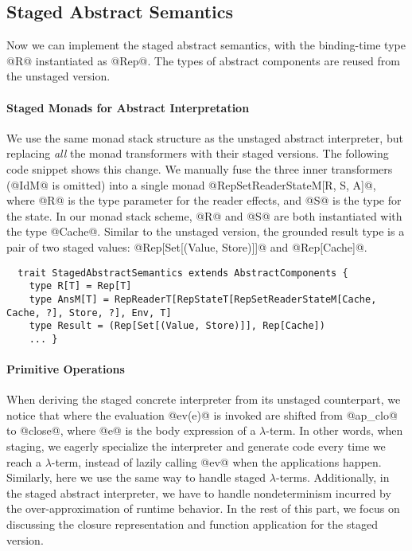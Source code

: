 \subsection{Staged Abstract Semantics}

Now we can implement the staged abstract semantics, with the binding-time
type @R@ instantiated as @Rep@. The types of abstract components are reused
from the unstaged version.

\paragraph{Staged Monads for Abstract Interpretation}
We use the same monad stack structure as the unstaged abstract interpreter,
but replacing \textit{all} the monad transformers with their staged versions. The
following code snippet shows this change.
We manually fuse the three inner transformers (@IdM@ is omitted) into a single
monad @RepSetReaderStateM[R, S, A]@, where @R@ is the type parameter for the
reader effects, and @S@ is the type for the state.  In our monad stack scheme,
@R@ and @S@ are both instantiated with the type @Cache@. Similar to the unstaged
version, the grounded result type is a pair of two staged values:
@Rep[Set[(Value, Store)]]@ and @Rep[Cache]@.
\begin{lstlisting}
  trait StagedAbstractSemantics extends AbstractComponents {
    type R[T] = Rep[T]
    type AnsM[T] = RepReaderT[RepStateT[RepSetReaderStateM[Cache, Cache, ?], Store, ?], Env, T]
    type Result = (Rep[Set[(Value, Store)]], Rep[Cache])
    ... }
\end{lstlisting}

\paragraph{Primitive Operations} 
When deriving the staged concrete interpreter from its unstaged counterpart, we
notice that where the evaluation @ev(e)@ is invoked are shifted from @ap_clo@ to
@close@, where @e@ is the body expression of a $\lambda$-term.
In other words, when staging, we eagerly specialize the interpreter and
generate code every time we reach a $\lambda$-term, instead of lazily
calling @ev@ when the applications happen.  Similarly, here we use the same way
to handle staged $\lambda$-terms.  Additionally, in the staged abstract
interpreter, we have to handle nondeterminism incurred by the
over-approximation of runtime behavior.  In the rest of this part, we 
focus on discussing the closure representation and function
application for the staged version.

